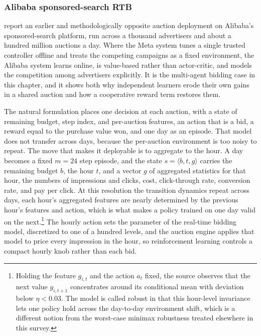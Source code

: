 \subsubsection{Alibaba sponsored-search RTB}
\citet{Zhao2018SponsoredSearchRTB} report an earlier and methodologically opposite auction deployment on Alibaba's sponsored-search platform, run across a thousand advertisers and about a hundred million auctions a day. Where the Meta system tunes a single trusted controller offline and treats the competing campaigns as a fixed environment, the Alibaba system learns online, is value-based rather than actor-critic, and models the competition among advertisers explicitly. It is the multi-agent bidding case in this chapter, and it shows both why independent learners erode their own gains in a shared auction and how a cooperative reward term restores them.

The natural formulation places one decision at each auction, with a state of remaining budget, step index, and per-auction features, an action that is a bid, a reward equal to the purchase value won, and one day as an episode. That model does not transfer across days, because the per-auction environment is too noisy to repeat. The move that makes it deployable is to aggregate to the hour. A day becomes a fixed $m=24$ step episode, and the state $s=\langle b,t,g\rangle$ carries the remaining budget $b$, the hour $t$, and a vector $g$ of aggregated statistics for that hour, the numbers of impressions and clicks, cost, click-through rate, conversion rate, and pay per click. At this resolution the transition dynamics repeat across days, each hour's aggregated features are nearly determined by the previous hour's features and action, which is what makes a policy trained on one day valid on the next.\footnote{Holding the feature $g_{i,t}$ and the action $a_t$ fixed, the source observes that the next value $g_{i,t+1}$ concentrates around its conditional mean with deviation below $\eta<0.03$. The model is called robust in that this hour-level invariance lets one policy hold across the day-to-day environment shift, which is a different notion from the worst-case minimax robustness treated elsewhere in this survey.} The hourly action sets the parameter of the real-time bidding model, discretized to one of a hundred levels, and the auction engine applies that model to price every impression in the hour, so reinforcement learning controls a compact hourly knob rather than each bid.

